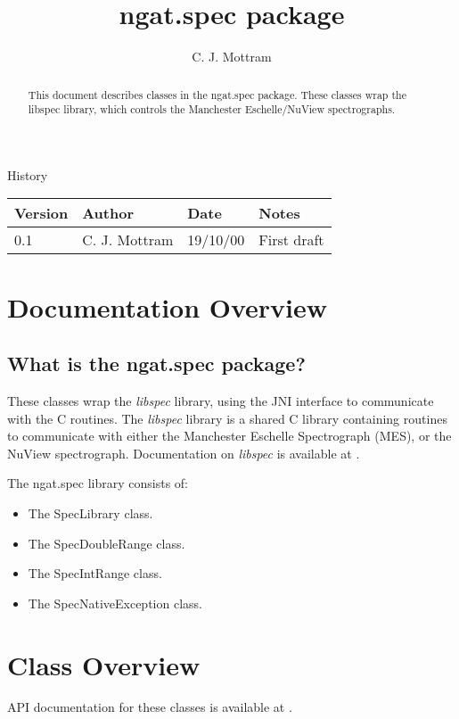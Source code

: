 \documentclass[10pt,a4paper]{article}
\title{ngat.spec package}
\author{C. J. Mottram}
\date{}
\begin{document}
\thispagestyle{empty}
\maketitle
\begin{abstract}
This document describes classes in the ngat.spec package.
These classes wrap the libspec library, which controls the Manchester Eschelle/NuView spectrographs.
\end{abstract}

\centerline{\Large History}
\begin{center}
\begin{tabular}{|l|l|l|p{15em}|}
\hline
{\bf Version} & {\bf Author} & {\bf Date} & {\bf Notes} \\
\hline
0.1 &              C. J. Mottram & 19/10/00 & First draft \\
\hline
\end{tabular}
\end{center}

\newpage
\tableofcontents
\listoffigures
\listoftables
\newpage

\section{Documentation Overview}
\subsection{What is the ngat.spec package?}
These classes wrap the {\em libspec} library, using the JNI interface to communicate with the C routines.
The {\em libspec} library is a shared C library containing routines to communicate with either the
Manchester Eschelle Spectrograph (MES), or the NuView spectrograph.
Documentation on {\em libspec} is available at \cite{bib:libspec}.

The ngat.spec library consists of:
\begin{itemize}
\item The SpecLibrary class.
\item The SpecDoubleRange class.
\item The SpecIntRange class.
\item The SpecNativeException class.
\end{itemize}

\section{Class Overview}
API documentation for these classes is available at \cite{bib:ngatspecapi}.
\end{document}
